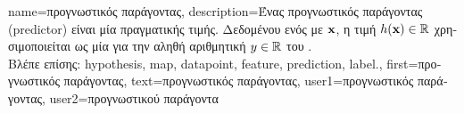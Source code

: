 {name={\foreignlanguage{greek}{προγνωστικός παράγοντας}},
	description={\foreignlanguage{greek}{Ένας προγνωστικός παράγοντας} (predictor) 
		\foreignlanguage{greek}{είναι μία}   \foreignlanguage{greek}{πραγματικής τιμής. Δεδομένου ενός} 
		 \foreignlanguage{greek}{με}  ${\bf x}$, \foreignlanguage{greek}{η τιμή 
		$h({\bf x}) \in \mathbb{R}$ χρησιμοποιείται ως μία}  \foreignlanguage{greek}{για την αληθή αριθμητική} 
		 $y \in \mathbb{R}$ \foreignlanguage{greek}{του} .
		\\
		\foreignlanguage{greek}{Βλέπε επίσης:} \gls{hypothesis}, \gls{map}, \gls{datapoint}, \gls{feature}, \gls{prediction}, \gls{label}.},
	first={\foreignlanguage{greek}{προγνωστικός παράγοντας}},
	text={\foreignlanguage{greek}{προγνωστικός παράγοντας}},
	user1={\foreignlanguage{greek}{προγνωστικός παράγοντας}}, %
  	user2={\foreignlanguage{greek}{προγνωστικού παράγοντα}} %
}

